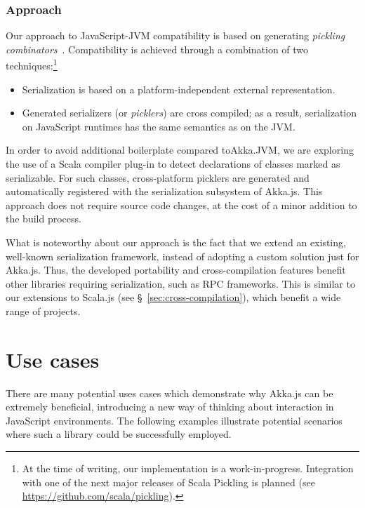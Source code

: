 \documentclass{sig-alternate}
\begin{document}
\subsubsection{Approach}

Our approach to JavaScript-JVM compatibility is based on generating {\em pickling
combinators}~\cite{MillerHBO13}. Compatibility is achieved through a combination of two
techniques:\footnote{At the time of writing, our implementation is a work-in-progress.
Integration with one of the next major releases of Scala Pickling is planned (see
\url{https://github.com/scala/pickling}).}
\begin{itemize}
\item Serialization is based on a platform-independent external representation.
\item Generated serializers (or {\em picklers}) are cross compiled; as a result,
      serialization on JavaScript runtimes has the same semantics as on the JVM.
\end{itemize}

In order to avoid additional boilerplate compared to\newline Akka.JVM, we are exploring
the use of a Scala compiler plug-in to detect declarations of classes
marked as serializable. For such classes, cross-platform picklers are generated
and automatically registered with the serialization subsystem of Akka.js.
This approach does not require source code changes, at the cost of a minor addition
to the build process.

What is noteworthy about our approach is the fact that we extend an existing,
well-known serialization framework, instead of adopting a custom solution just
for Akka.js. Thus, the developed portability and cross-compilation features benefit other
libraries requiring serialization, such as RPC frameworks. This is similar to
our extensions to Scala.js (see \S~\ref{sec:cross-compilation}), which benefit
a wide range of projects.


\section{Use cases}\label{sec:usecases}

There are many potential uses cases which demonstrate why Akka.js can be extremely beneficial, introducing a new way of thinking about interaction in JavaScript environments. The following examples illustrate potential scenarios where such a library could be successfully employed.
\end{document}
